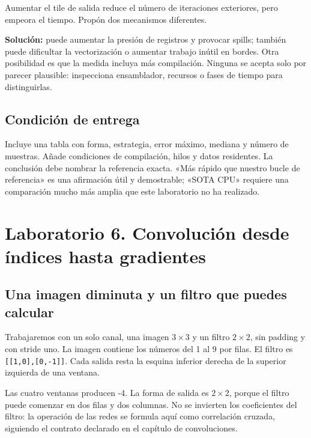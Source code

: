 \documentclass[12pt,a4paper,oneside]{report}
\begin{document}
\begin{practica}
Aumentar el tile de salida reduce el número de iteraciones exteriores, pero empeora el tiempo. Propón dos mecanismos diferentes.

\textbf{Solución:} puede aumentar la presión de registros y provocar spills; también puede dificultar la vectorización o aumentar trabajo inútil en bordes. Otra posibilidad es que la medida incluya más compilación. Ninguna se acepta solo por parecer plausible: inspecciona ensamblador, recursos o fases de tiempo para distinguirlas.

\end{practica}
\section{Condición de entrega}
Incluye una tabla con forma, estrategia, error máximo, mediana y número de muestras. Añade condiciones de compilación, hilos y datos residentes. La conclusión debe nombrar la referencia exacta. «Más rápido que nuestro bucle de referencia» es una afirmación útil y demostrable; «SOTA CPU» requiere una comparación mucho más amplia que este laboratorio no ha realizado.

\chapter{Laboratorio 6. Convolución desde índices hasta gradientes}
\label{lab:seis}
\section{Una imagen diminuta y un filtro que puedes calcular}
Trabajaremos con un solo canal, una imagen $3\times3$ y un filtro $2\times2$, sin padding y con stride uno. La imagen contiene los números del 1 al 9 por filas. El filtro es \texttt{[[1,0],[0,-1]]}. Cada salida resta la esquina inferior derecha de la superior izquierda de una ventana.

Las cuatro ventanas producen -4. La forma de salida es $2\times2$, porque el filtro puede comenzar en dos filas y dos columnas. No se invierten los coeficientes del filtro: la operación de las redes se formula aquí como correlación cruzada, siguiendo el contrato declarado en el capítulo de convoluciones.
\end{document}
